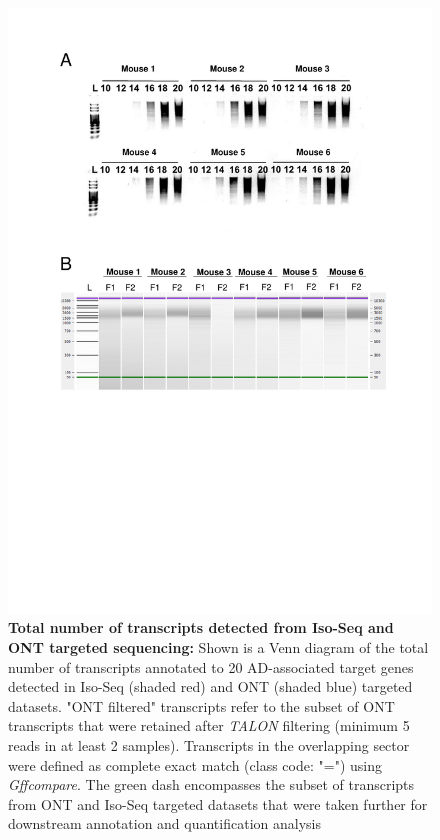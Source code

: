 \vspace{2cm}
\begin{figure}[htp]
	\centering
	\vspace{20pt}
	\includegraphics[page=4,trim={0 4cm 0 14cm},clip,scale = 0.75]{Figures/TargetedTranscriptome_LabResults.pdf}
	\captionsetup{width=0.95\textwidth}
	\caption[Total number of transcripts detected from Iso-Seq and ONT targeted sequencing]%
	{\textbf{Total number of transcripts detected from Iso-Seq and ONT targeted sequencing:} Shown is a Venn diagram of the total number of transcripts annotated to 20 AD-associated target genes detected in Iso-Seq (shaded red) and ONT (shaded blue) targeted datasets. "ONT filtered" transcripts refer to the subset of ONT transcripts that were retained after \textit{TALON} filtering (minimum 5 reads in at least 2 samples). Transcripts in the overlapping sector were defined as complete exact match (class code: "=") using \textit{Gffcompare}. The green dash encompasses the subset of transcripts from ONT and Iso-Seq targeted datasets that were taken further for downstream annotation and quantification analysis}
	\label{fig:ont_isoseq_venn}
\end{figure}

